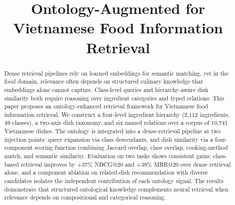 \documentclass[conference]{IEEEtran}
\begin{document}
\title{Ontology-Augmented for Vietnamese Food Information Retrieval}

\author{
\and
{}
\and
{}
}

\maketitle

\begin{abstract}
Dense retrieval pipelines rely on learned embeddings for semantic matching, yet in the food domain, relevance often depends on structured culinary knowledge that embeddings alone cannot capture. Class-level queries and hierarchy-aware dish similarity both require reasoning over ingredient categories and typed relations. This paper proposes an ontology-enhanced retrieval framework for Vietnamese food information retrieval. We construct a four-level ingredient hierarchy (2{,}112 ingredients, 49 classes), a two-axis dish taxonomy, and six named relations over a corpus of 10{,}741 Vietnamese dishes. The ontology is integrated into a dense-retrieval pipeline at two injection points: query expansion via class descendants, and dish similarity via a four-component scoring function combining Jaccard overlap, class overlap, cooking-method match, and semantic similarity. Evaluation on two tasks shows consistent gains: class-based retrieval improves by +37\% NDCG@20 and +39\% MRR@20 over dense retrieval alone, and a component ablation on related-dish recommendation with diverse candidates isolates the independent contribution of each ontology signal. The results demonstrate that structured ontological knowledge complements neural retrieval when relevance depends on compositional and categorical reasoning.

\end{abstract}
\end{document}
